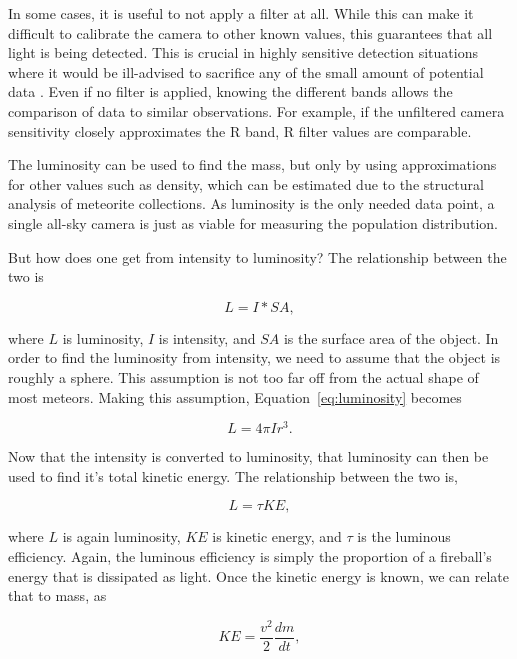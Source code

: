 In some cases, it is useful to not apply a filter at all. While this can make it difficult to calibrate the camera to other known values, this guarantees that all light is being detected. This is crucial in highly sensitive detection situations where it would be ill-advised to sacrifice any of the small amount of potential data \cite{Rembold2015}. Even if no filter is applied, knowing the different bands allows the comparison of data to similar observations. For example, if the unfiltered camera sensitivity closely approximates the R band, R filter values are comparable.

The luminosity can be used to find the mass, but only by using approximations for other values such as density, which can be estimated due to the structural analysis of meteorite collections. As luminosity is the only needed data point, a single all-sky camera is just as viable for measuring the population distribution.

But how does one get from intensity to luminosity? The relationship between the two is

\begin{equation}
	L = I * SA,
	\label{eq:luminosity}
\end{equation}

where $L$ is luminosity, $I$ is intensity, and $SA$ is the surface area of the object. In order to find the luminosity from intensity, we need to assume that the object is roughly a sphere. This assumption is not too far off from the actual shape of most meteors. Making this assumption, Equation~\ref{eq:luminosity} becomes 

\begin{equation}
	L = 4 \pi I r^3.
\end{equation}

Now that the intensity is converted to luminosity, that luminosity can then be used to find it's total kinetic energy. The relationship between the two is,

\begin{equation}
	L = \tau KE,
	\label{eq:kinetic}
\end{equation}

where $L$ is again luminosity, $KE$ is kinetic energy, and $\tau$ is the luminous efficiency. Again, the luminous efficiency is simply the proportion of a fireball's energy that is dissipated as light. Once the kinetic energy is known, we can relate that to mass, as

\begin{equation}
	KE = \frac{v^2}{2}\frac{dm}{dt},
\end{equation}


